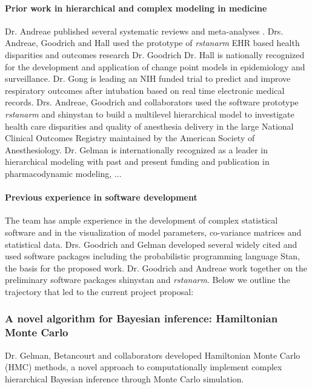 \documentclass[11pt,notitlepage]{article}
\begin{document}
\paragraph*{Prior work in hierarchical and complex modeling in medicine} Dr. Andreae published several systematic reviews and meta-analyses \cite{Andreae2013, Andreae2015, Carter2015}. Drs. Andreae, Goodrich and Hall used the prototype of \textit{rstanarm} EHR based health disparities and outcomes research \cite{AndreaeWhite2015} Dr. Goodrich Dr. Hall is nationally recognized for the development and application of change point models in epidemiology and surveillance. Dr. Gong is leading an NIH funded trial to predict and improve respiratory outcomes after intubation based on real time electronic medical records.  Drs. Andreae, Goodrich and collaborators used the software prototype \textit{rstanarm} and shinystan to build a multilevel hierarchical model to investigate health care disparities and quality of anesthesia delivery in the large National Clinical Outcomes Registry maintained by the American Society of Anesthesiology. Dr. Gelman is internationally recognized as a leader in hierarchical modeling with past and present funding and publication in pharmacodynamic modeling, ...

\paragraph*{Previous experience in software development} 
The team has ample experience in the development of complex statistical software and in the visualization of model parameters, co-variance matrices and statistical data.  Drs. Goodrich and Gelman developed several widely cited and used software packages including the probabilistic programming language Stan\cite{SDT2014}, the basis for the proposed work. Dr. Goodrich and Andreae work together on the preliminary software packages shinystan and \textit{rstanarm}. Below we outline the trajectory that led to the current project proposal:
\newline

\subsubsection*{A novel algorithm for Bayesian inference: Hamiltonian Monte Carlo}
Dr. Gelman, Betancourt and collaborators developed Hamiltonian Monte Carlo (HMC) methods, a novel approach to computationally implement complex hierarchical Bayesian inference through Monte Carlo simulation. 
\end{document}
